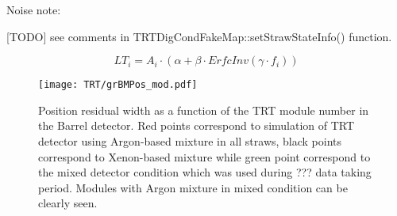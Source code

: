 Noise note:~\cite{Kittelmann:987854}


[TODO] see comments in TRTDigCondFakeMap::setStrawStateInfo() function.


\begin{equation}
 LT_i = A_i \cdot (\alpha + \beta \cdot ErfcInv(\gamma \cdot f_i)) %
\end{equation}





\begin{figure}
\begin{center}
 \texttt{[image: TRT/grBMPos\_mod.pdf]}
\caption{ Position residual width as a function of the TRT module number in the Barrel detector. Red points correspond to simulation of TRT detector
using Argon-based mixture in all straws, black points correspond to Xenon-based mixture while green point correspond to the mixed detector condition
which was used during ??? data taking period. Modules with Argon mixture in mixed condition can be clearly seen.}
\label{fig:meanFreePath}
\end{center}
\end{figure}




